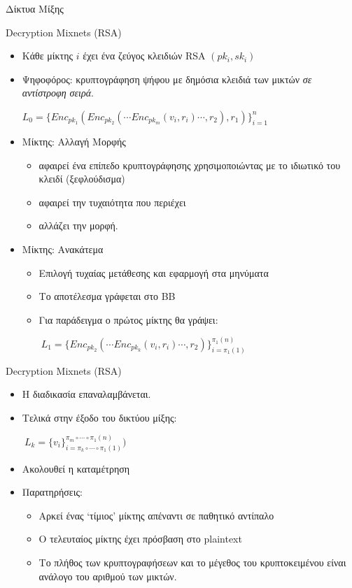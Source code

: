 \documentclass[handout]{beamer}
\begin{document}
\begin{section}{Δίκτυα Μίξης}
\begin{frame}{Decryption Mixnets (RSA)}
\begin{itemize}
    \item Κάθε μίκτης $i$ έχει ένα ζεύγος κλειδιών RSA $(pk_i, sk_i)$ \pause 
    \item Ψηφοφόρος: κρυπτογράφηση ψήφου με δημόσια κλειδιά των μικτών \textit{σε αντίστροφη σειρά}. 
        \begin{center}
        $L_0 = \{ Enc_{pk_1}(Enc_{pk_2}( \cdots Enc_{pk_m}(v_i,r_i) \cdots, r_2), r_1) \}_{i=1}^n$
        \end{center}
    \item Μίκτης: Αλλαγή Μορφής \pause 
    \begin{itemize}
    \item αφαιρεί ένα επίπεδο κρυπτογράφησης χρησιμοποιώντας με το ιδιωτικό του κλειδί (ξεφλούδισμα)
    \item αφαιρεί την τυχαιότητα που περιέχει
    \item αλλάζει την μορφή.
    \end{itemize} \pause 
    \item Μίκτης: Ανακάτεμα \\ 
    \begin{itemize}
        \item Επιλογή τυχαίας μετάθεσης και εφαρμογή στα μηνύματα
        \item Το αποτέλεσμα γράφεται στο ΒΒ
        \item Για παράδειγμα ο πρώτος μίκτης θα γράψει:        
        \begin{center}
         $\ L_1 = \{ Enc_{pk_2}( \cdots Enc_{pk_k}(v_{i},r_{i}) \cdots, r_2) \}_{i=\pi_1(1)}^{\pi_1(n)} $
        \end{center}        
    \end{itemize} 
 \end{itemize}
 \end{frame}
 \begin{frame}{Decryption Mixnets (RSA)}
 \begin{itemize}
    \item Η διαδικασία επαναλαμβάνεται. \pause 
    \item Τελικά στην έξοδο  του δικτύου μίξης:
        \begin{center}
        $\ L_k = \{  v_{i} \}_{i=\pi_k \circ \cdots \circ \pi_1(1)}^{\pi_m \circ \cdots \circ \pi_1(n)}) $
        \end{center} \pause 
    \item Ακολουθεί η καταμέτρηση 
    \item Παρατηρήσεις: \pause 
        \begin{itemize}
            \item Αρκεί ένας `τίμιος' μίκτης απέναντι σε παθητικό αντίπαλο
            \item Ο τελευταίος μίκτης έχει πρόσβαση στο plaintext
            \item Το πλήθος των κρυπτογραφήσεων και το μέγεθος του κρυπτοκειμένου είναι ανάλογο του αριθμού των μικτών.
        \end{itemize}
\end{itemize} 
\end{frame}


\end{section}
\end{document}
